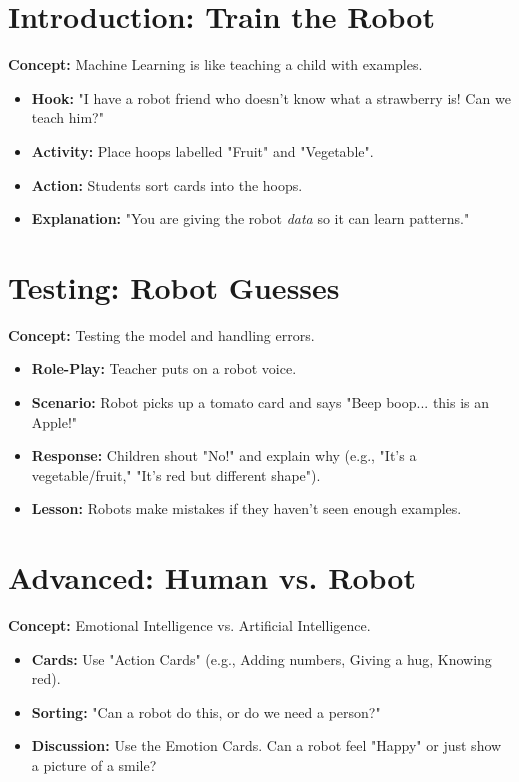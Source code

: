\documentclass[11pt, a4paper]{article}
\begin{document}
\section{Introduction: Train the Robot}
\textbf{Concept:} Machine Learning is like teaching a child with examples.
\begin{itemize}
    \item \textbf{Hook:} "I have a robot friend who doesn't know what a strawberry is! Can we teach him?"
    \item \textbf{Activity:} Place hoops labelled "Fruit" and "Vegetable".
    \item \textbf{Action:} Students sort cards into the hoops.
    \item \textbf{Explanation:} "You are giving the robot \textit{data} so it can learn patterns."
\end{itemize}

\section{Testing: Robot Guesses}
\textbf{Concept:} Testing the model and handling errors.
\begin{itemize}
    \item \textbf{Role-Play:} Teacher puts on a robot voice.
    \item \textbf{Scenario:} Robot picks up a tomato card and says "Beep boop... this is an Apple!"
    \item \textbf{Response:} Children shout "No!" and explain why (e.g., "It's a vegetable/fruit," "It's red but different shape").
    \item \textbf{Lesson:} Robots make mistakes if they haven't seen enough examples.
\end{itemize}

\section{Advanced: Human vs. Robot}
\textbf{Concept:} Emotional Intelligence vs. Artificial Intelligence.
\begin{itemize}
    \item \textbf{Cards:} Use "Action Cards" (e.g., Adding numbers, Giving a hug, Knowing red).
    \item \textbf{Sorting:} "Can a robot do this, or do we need a person?"
    \item \textbf{Discussion:} Use the Emotion Cards. Can a robot feel "Happy" or just show a picture of a smile?
\end{itemize}
\end{document}
